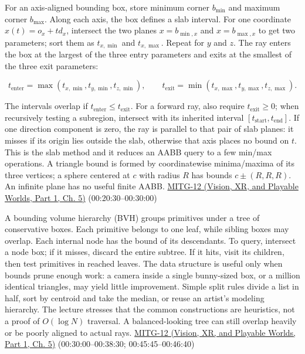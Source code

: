 For an axis-aligned bounding box, store minimum corner \(b_{\min}\) and maximum corner \(b_{\max}\). Along each axis, the box defines a slab interval. For one coordinate \(x(t)=o_x+td_x\), intersect the two planes \(x=b_{\min,x}\) and \(x=b_{\max,x}\) to get two parameters; sort them as \(t_{x,\min}\) and \(t_{x,\max}\). Repeat for \(y\) and \(z\). The ray enters the box at the largest of the three entry parameters and exits at the smallest of the three exit parameters:

\[
t_{\mathrm{enter}}=\max(t_{x,\min},t_{y,\min},t_{z,\min}),\qquad
t_{\mathrm{exit}}=\min(t_{x,\max},t_{y,\max},t_{z,\max}).
\]

The intervals overlap if \(t_{\mathrm{enter}}\leq t_{\mathrm{exit}}\). For a forward ray, also require \(t_{\mathrm{exit}}\geq0\); when recursively testing a subregion, intersect with its inherited interval \([t_{\mathrm{start}},t_{\mathrm{end}}]\). If one direction component is zero, the ray is parallel to that pair of slab planes: it misses if its origin lies outside the slab, otherwise that axis places no bound on \(t\). This is the slab method and it reduces an AABB query to a few min/max operations. A triangle bound is formed by coordinatewise minima/maxima of its three vertices; a sphere centered at \(c\) with radius \(R\) has bounds \(c\pm(R,R,R)\). An infinite plane has no useful finite AABB. \href{../07-Vision-XR-and-Playable-Worlds-P01/main.pdf\#nameddest=04-visual-computing-ii-ch036-mitg-12---ray-tracing-ii}{MITG-12 (Vision, XR, and Playable Worlds, Part 1, Ch. 5)} (00:20:30--00:30:00)

A bounding volume hierarchy (BVH) groups primitives under a tree of conservative boxes. Each primitive belongs to one leaf, while sibling boxes may overlap. Each internal node has the bound of its descendants. To query, intersect a node box; if it misses, discard the entire subtree. If it hits, visit its children, then test primitives in reached leaves. The data structure is useful only when bounds prune enough work: a camera inside a single bunny-sized box, or a million identical triangles, may yield little improvement. Simple split rules divide a list in half, sort by centroid and take the median, or reuse an artist's modeling hierarchy. The lecture stresses that the common constructions are heuristics, not a proof of \(O(\log N)\) traversal. A balanced-looking tree can still overlap heavily or be poorly aligned to actual rays. \href{../07-Vision-XR-and-Playable-Worlds-P01/main.pdf\#nameddest=04-visual-computing-ii-ch036-mitg-12---ray-tracing-ii}{MITG-12 (Vision, XR, and Playable Worlds, Part 1, Ch. 5)} (00:30:00--00:38:30; 00:45:45--00:46:40)

